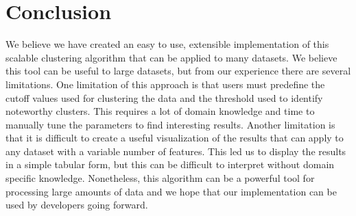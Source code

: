 \documentclass{article}
\begin{document}
\section{Conclusion}
We believe we have created an easy to use, extensible implementation of this scalable clustering algorithm that can be applied to many datasets. We believe this tool can be useful to large datasets, but from our experience there are several limitations. One limitation of this approach is that users must predefine the cutoff values used for clustering the data and the threshold used to identify noteworthy clusters. This requires a lot of domain knowledge and time to manually tune the parameters to find interesting results. Another limitation is that it is difficult to create a useful visualization of the results that can apply to any dataset with a variable number of features. This led us to display the results in a simple tabular form, but this can be difficult to interpret without domain specific knowledge. Nonetheless, this algorithm can be a powerful tool for processing large amounts of data and we hope that our implementation can be used by developers going forward.


\end{document}
